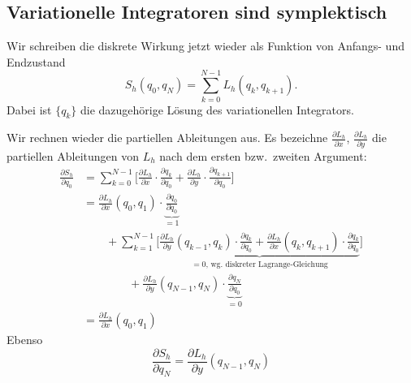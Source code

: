 \documentclass[german]{scrreprt}
\theoremstyle{plain}
\theoremstyle{nonumberplain}
\theoremstyle{nonumberplain}
\theoremstyle{nonumberplain}
\begin{document}

\renewcommand*\contentsname{\huge \centering Optimierung \& Numerik --- Vorlesung 20}
\tableofcontents


\setcounter{chapter}{12}
\setcounter{section}{5}
\setcounter{subsection}{2}
\setcounter{satz}{8}
\setcounter{lemma}{1}
\setcounter{equation}{5}





\subsection{Variationelle Integratoren sind symplektisch}

Wir schreiben die diskrete Wirkung jetzt wieder als Funktion von Anfangs- und Endzustand
\begin{equation*}
S_h(q_0, q_N) = \sum_{k=0}^{N-1} L_h (q_k, q_{k+1}).
\end{equation*}
Dabei ist $\{q_k\}$ die dazugehörige Lösung des variationellen Integrators.

Wir rechnen wieder die partiellen Ableitungen aus. Es bezeichne $\frac{\partial L_h}{\partial x}$, $\frac{\partial L_h}{\partial y}$ die partiellen Ableitungen von $L_h$ nach dem ersten bzw.\ zweiten Argument:
\begin{align*}
\frac{\partial S_h}{\partial q_0}
& = \sum_{k=0}^{N-1} \Bigg[ \frac{\partial L_h}{\partial x} \cdot\frac{\partial q_k}{\partial q_0} +  \frac{\partial L_h}{\partial y} \cdot\frac{\partial q_{k+1}}{\partial q_0}\Bigg] \\
%
& = \frac{\partial L_h}{\partial x} (q_0,q_1)\cdot \underbrace{\frac{\partial q_0}{\partial q_0}}_{=1} \\
& \qquad  + \sum_{k=1}^{N-1} \Bigg[ \underbrace{\frac{\partial L_h}{\partial y}(q_{k-1},q_k) \cdot\frac{\partial q_k}{\partial q_0} +  \frac{\partial L_h}{\partial x} (q_k,q_{k+1})\cdot\frac{\partial q_k}{\partial q_0}}_{\text{$=0$, wg.\ diskreter Lagrange-Gleichung}}\Bigg] \\
& \qquad \qquad  + \frac{\partial L_h}{\partial y} (q_{N-1},q_N)\cdot \underbrace{\frac{\partial q_N}{\partial q_0}}_{=0} \\
%
& = \frac{\partial L_h}{\partial x} (q_0, q_1)
\end{align*}
Ebenso 
\begin{equation*}
\frac{\partial S_h}{\partial q_N}  = \frac{\partial L_h}{\partial y} (q_{N-1}, q_N)
\end{equation*}
\end{document}
